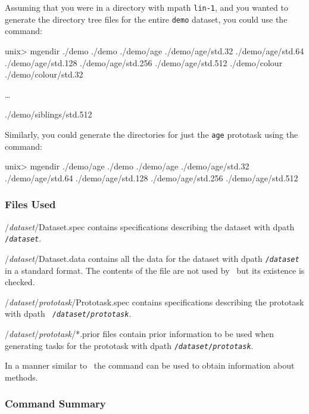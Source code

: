Assuming that you were in a directory with mpath \texttt{lin-1}, and
you wanted to generate the directory tree files for the entire
\texttt{demo} dataset, you could use the command:
\begin{Session}
unix> mgendir ./demo
./demo
./demo/age
./demo/age/std.32
./demo/age/std.64
./demo/age/std.128
./demo/age/std.256
./demo/age/std.512
./demo/colour
./demo/colour/std.32

\ldots

./demo/siblings/std.512
\end{Session}
Similarly, you could generate the directories for just the \texttt{age}
prototask using the command:
\begin{Session}
unix> mgendir ./demo/age
./demo
./demo/age
./demo/age/std.32
./demo/age/std.64
./demo/age/std.128
./demo/age/std.256
./demo/age/std.512
\end{Session}

\subsubsection*{Files Used}
\begin{ttdescription}
\item[/{\rm\em dataset\/}/Dataset.spec]
    contains specifications describing the dataset with dpath {\tt
    /{\rm\em dataset}}.
\item[/{\rm\em dataset\/}/Dataset.data]
    contains all the data for the dataset with dpath \texttt{/{\rm\em dataset}}
    in a \delve{} standard format.  The contents of the file are not
    used by \dinfo\, but its existence is checked.
\item[/{\rm\em dataset\/}/{\rm\em prototask\/}/Prototask.spec]
    contains specifications describing the prototask with dpath {\tt
    /{\rm\em dataset\/}/{\rm\em prototask}}.
\item[/{\rm\em dataset\/}/{\rm\em prototask\/}/*.prior]
    files contain prior information to be used when generating tasks for 
    the prototask with dpath \texttt{/{\rm\em dataset\/}/{\rm\em prototask}}.
\end{ttdescription}

%
%


In a manner similar to \dinfo\, the \minfo{} command can be used to
obtain information about \delve{} methods.

\subsubsection*{Command Summary}

